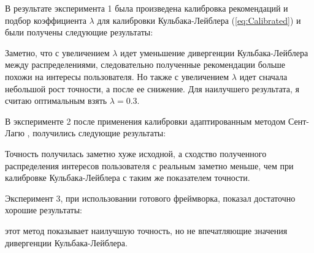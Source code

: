 В результате эксперимента 1 была произведена калибровка рекомендаций и подбор коэффициента $\lambda$ для калибровки Кульбака-Лейблера (\ref{eq:Calibrated})
и были получены следующие результаты:
\begin{center}
   \end{center}
Заметно, что с увеличением $\lambda$ идет уменьшение дивергенции Кульбака-Лейблера между распределениями, следовательно
полученные рекомендации больше похожи на интересы пользователя. Но также 
с увеличением $\lambda$ идет сначала небольшой рост точности, а после ее снижение.
Для наилучшего результата, я считаю оптимальным взять $\lambda=0.3$.

В эксперименте 2 после применения калибровки адаптированным методом Сент-Лагю \cite{bib5}, получились следующие результаты:
\begin{center}
   \end{center}
Точность получилась заметно хуже исходной, а сходство полученного
распределения интересов пользователя с реальным заметно меньше, чем 
при калибровке Кульбака-Лейблера с таким же показателем точности.

Эксперимент 3, при использовании готового фреймворка, показал достаточно хорошие результаты:
\begin{center}
   \end{center}
этот метод показывает наилучшую точность, но не впечатляющие значения дивергенции Кульбака-Лейблера.

